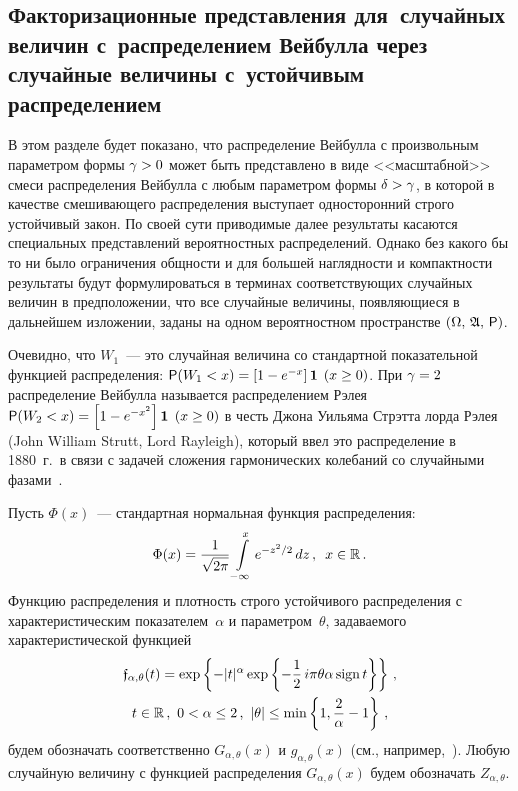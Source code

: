 \begin{multicols}{2}
\vspace*{-6pt}

\section{Факторизационные представления для~случайных величин
с~распределением Вейбулла через случайные величины с~устойчивым
распределением}

\vspace*{-2pt}

В этом разделе будет показано, что распределение Вейбулла с
произвольным параметром формы $\gamma\hm>0$ может быть представлено в
виде <<масштабной>> смеси распределения Вейбулла с любым параметром
формы $\delta\hm>\gamma$, в которой в качестве смешивающего
распределения выступает односторонний строго устойчивый закон. По
своей сути приводимые далее результаты касаются специальных
представлений вероятностных распределений. Однако без какого бы то
ни было ограничения общности и для большей наглядности и
компактности результаты будут формулироваться в терминах
соответствующих случайных величин в предположении, что все случайные
величины, появляющиеся в дальнейшем изложении, заданы на одном
вероятностном пространстве $(\Omega,\,\mathfrak{A},\,{\sf P})$.

Очевидно, что $W_1$~--- это случайная величина со стандартной
показательной функцией распределения: ${\sf
P}(W_1<x)\hm=\left[1-e^{-x}\right]{\bf 1}$ $(x\hm\ge0)$. При $\gamma\hm=2$
распределение Вейбулла называется распределением Рэлея
${\sf P}(W_2<x)=\left[1-e^{-x^2}\right]{\bf 1}$ $(x\hm\ge0)$ в честь Джона Уильяма
Стрэтта лорда Рэлея (John William Strutt, Lord Rayleigh), который
ввел это распределение в 1880~г.\ в связи с задачей сложения
гармонических колебаний со случайными фазами~\cite{Rayleigh1880}.

Пусть $\Phi(x)$~--- стандартная нормальная функция распределения:
$$
\Phi(x)=\displaystyle\frac{\displaystyle 1\mathstrut}{\displaystyle \sqrt{2\pi}\mathstrut}\int\limits_{-\infty}^{x}e^{-z^2/2}\,dz\,,\enskip
x\in\mathbb{R}\,.
$$
Функцию распределения и плотность строго устойчивого распределения с
характеристическим показателем~$\alpha$ и параметром~$\theta$,
задаваемого характеристической функцией
\begin{multline}
\mathfrak{f}_{\alpha,\theta}(t)=
\exp\left\{-|t|^{\alpha}\exp\left\{-\displaystyle\frac{\displaystyle 1\mathstrut}{\displaystyle 2\mathstrut}\,i\pi\theta\alpha\,\mathrm{sign}\,t\right\}\right\}\,,
\\ t\in\mathbb{R}\,,\
0<\alpha\le2\,,\  |\theta|\le\min\left\{1,\displaystyle\frac{\displaystyle 2\mathstrut}{\displaystyle \alpha\mathstrut}-1\right\}\,,
\label{e2-kor}
\end{multline}
 будем
обозначать соответственно $G_{\alpha,\theta}(x)$ и
$g_{\alpha,\theta}(x)$ (см., например,~\cite{Zolotarev1983}). Любую
случайную величину с функцией распределения $G_{\alpha,\theta}(x)$
будем обозначать $Z_{\alpha,\theta}$.


\end{multicols}
